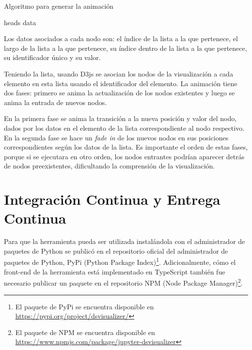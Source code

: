 \begin{algorithm}[htb]
  \caption{Algoritmo para generar la animación}
  \label{alg:generar-animacion}
  \begin{algorithmic}[1]
    \State heads \gets {}
    \State data \gets {} 

    \State {} 
    \State {} 
    \State \Return
  \EndFunction
  \end{algorithmic}
\end{algorithm}

Los datos asociados a cada nodo son: el índice de la lista a la que pertenece, el largo de la lista a la que pertenece, su índice dentro de la lista a la que pertenece, su identificador único y su valor.

Teniendo la lista, usando D3js se asocian los nodos de la visualización a cada elemento en esta lista usando el identificador del elemento. La animación tiene dos fases: primero se anima la actualización de los nodos existentes y luego se anima la entrada de nuevos nodos.

En la primera fase se anima la transición a la nueva posición y valor del nodo, dados por los datos en el elemento de la lista correspondiente al nodo respectivo. En la segunda fase se hace un \textit{fade in} de los nuevos nodos en sus posiciones correspondientes según los datos de la lista. Es importante el orden de estas fases, porque si se ejecutara en otro orden, los nodos entrantes podrían aparecer detrás de nodos preexistentes, dificultando la comprensión de la visualización.

\section{Integración Continua y Entrega Continua}

Para que la herramienta pueda ser utilizada instalándola con el administrador de paquetes de Python se publicó en el repositorio oficial del administrador de paquetes de Python, PyPi (Python Package Index)\footnote{El paquete de PyPi se encuentra disponible en \url{https://pypi.org/project/dsvisualizer/}}. Adicionalmente, cómo el front-end de la herramienta está implementado en TypeScript también fue necesario publicar un paquete en el repositorio NPM (Node Package Manager)\footnote{El paquete de NPM se encuentra disponible en \url{https://www.npmjs.com/package/jupyter-dsvisualizer}}.


